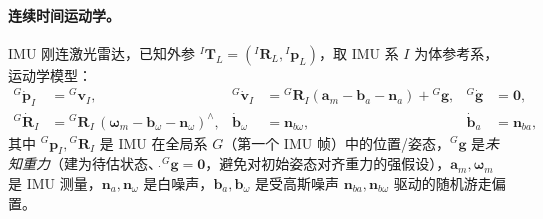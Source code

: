 \paragraph{连续时间运动学。}
IMU 刚连激光雷达，已知外参 ${}^I\mathbf{T}_L=({}^I\mathbf{R}_L,{}^I\mathbf{p}_L)$，取 IMU 系 $I$ 为体参考系，运动学模型\cite{xu2021fastlio}：
\begin{equation}
\begin{aligned}
{}^G\dot{\mathbf{p}}_I&={}^G\mathbf{v}_I, &
{}^G\dot{\mathbf{v}}_I&={}^G\mathbf{R}_I(\mathbf{a}_m-\mathbf{b}_a-\mathbf{n}_a)+{}^G\mathbf{g}, &
{}^G\dot{\mathbf{g}}&=\mathbf{0},\\
{}^G\dot{\mathbf{R}}_I&={}^G\mathbf{R}_I\,(\boldsymbol{\omega}_m-\mathbf{b}_\omega-\mathbf{n}_\omega)^\wedge, &
\dot{\mathbf{b}}_\omega&=\mathbf{n}_{b\omega}, &
\dot{\mathbf{b}}_a&=\mathbf{n}_{ba},
\end{aligned}
\label{eq:lidar-fl-cont}
\end{equation}
其中 ${}^G\mathbf{p}_I,{}^G\mathbf{R}_I$ 是 IMU 在全局系 $G$（第一个 IMU 帧）中的位置/姿态，${}^G\mathbf{g}$ 是\emph{未知重力}（建为待估状态、$\dot{}^G\mathbf{g}=\mathbf{0}$，避免对初始姿态对齐重力的强假设），$\mathbf{a}_m,\boldsymbol{\omega}_m$ 是 IMU 测量，$\mathbf{n}_a,\mathbf{n}_\omega$ 是白噪声，$\mathbf{b}_a,\mathbf{b}_\omega$ 是受高斯噪声 $\mathbf{n}_{ba},\mathbf{n}_{b\omega}$ 驱动的随机游走偏置。

